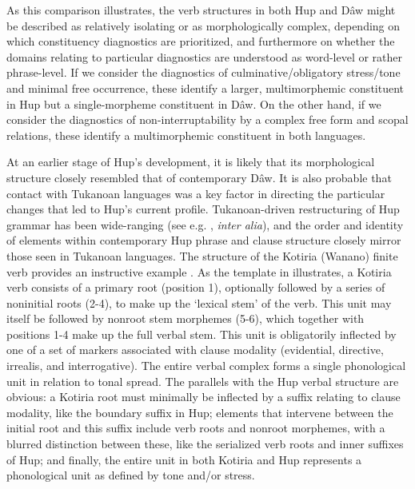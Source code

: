 \documentclass[output=paper]{langscibook}
\begin{document}
As this comparison illustrates, the verb structures in both Hup and Dâw might be described as relatively isolating or as morphologically complex, depending on which constituency diagnostics are prioritized, and furthermore on whether the domains relating to particular diagnostics are understood as word-level or rather phrase-level. If we consider the diagnostics of culminative/obligatory stress/tone and minimal free occurrence, these identify a larger, multimorphemic constituent in Hup but a single-morpheme constituent in Dâw. On the other hand, if we consider the diagnostics of non-interruptability by a complex free form and scopal relations, these identify a multimorphemic constituent in both languages.

At an earlier stage of Hup's development, it is likely that its morphological structure closely resembled that of contemporary Dâw. It is also probable that contact with Tukanoan languages was a key factor in directing the particular changes that led to Hup's current profile. Tukanoan-driven restructuring of Hup grammar has been wide-ranging (see e.g. \citealt{Epps2007,Epps2008, Epps2008c}, \textit{inter alia}), and the order and identity of elements within contemporary Hup phrase and clause structure closely mirror those seen in Tukanoan languages. The structure of the Kotiria (Wanano) finite verb provides an instructive example \citep[244-245]{Stenzel2013}. As the template in  illustrates, a Kotiria verb consists of a primary root (position 1), optionally followed by a series of noninitial roots (2-4), to make up the `lexical stem' of the verb. This unit may itself be followed by nonroot stem morphemes (5-6), which together with positions 1-4 make up the full verbal stem. This unit is obligatorily inflected by one of a set of markers associated with clause modality (evidential, directive, irrealis, and interrogative). The entire verbal complex forms a single phonological unit in relation to tonal spread. The parallels with the Hup verbal structure are obvious: a Kotiria root must minimally be inflected by a suffix relating to clause modality, like the boundary suffix in Hup; elements that intervene between the initial root and this suffix include verb roots and nonroot morphemes, with a blurred distinction between these, like the serialized verb roots and inner suffixes of Hup; and finally, the entire unit in both Kotiria and Hup represents a phonological unit as defined by tone and/or stress.
\end{document}
